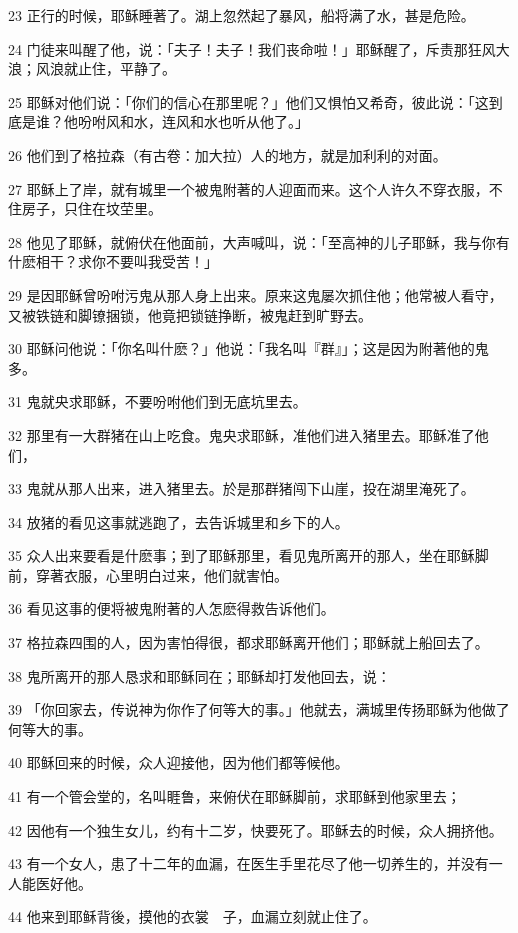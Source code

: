 \par 23 正行的时候，耶稣睡著了。湖上忽然起了暴风，船将满了水，甚是危险。
\par 24 门徒来叫醒了他，说：「夫子！夫子！我们丧命啦！」耶稣醒了，斥责那狂风大浪；风浪就止住，平静了。
\par 25 耶稣对他们说：「你们的信心在那里呢？」他们又惧怕又希奇，彼此说：「这到底是谁？他吩咐风和水，连风和水也听从他了。」
\par 26 他们到了格拉森（有古卷：加大拉）人的地方，就是加利利的对面。
\par 27 耶稣上了岸，就有城里一个被鬼附著的人迎面而来。这个人许久不穿衣服，不住房子，只住在坟茔里。
\par 28 他见了耶稣，就俯伏在他面前，大声喊叫，说：「至高神的儿子耶稣，我与你有什麽相干？求你不要叫我受苦！」
\par 29 是因耶稣曾吩咐污鬼从那人身上出来。原来这鬼屡次抓住他；他常被人看守，又被铁链和脚镣捆锁，他竟把锁链挣断，被鬼赶到旷野去。
\par 30 耶稣问他说：「你名叫什麽？」他说：「我名叫『群』」；这是因为附著他的鬼多。
\par 31 鬼就央求耶稣，不要吩咐他们到无底坑里去。
\par 32 那里有一大群猪在山上吃食。鬼央求耶稣，准他们进入猪里去。耶稣准了他们，
\par 33 鬼就从那人出来，进入猪里去。於是那群猪闯下山崖，投在湖里淹死了。
\par 34 放猪的看见这事就逃跑了，去告诉城里和乡下的人。
\par 35 众人出来要看是什麽事；到了耶稣那里，看见鬼所离开的那人，坐在耶稣脚前，穿著衣服，心里明白过来，他们就害怕。
\par 36 看见这事的便将被鬼附著的人怎麽得救告诉他们。
\par 37 格拉森四围的人，因为害怕得很，都求耶稣离开他们；耶稣就上船回去了。
\par 38 鬼所离开的那人恳求和耶稣同在；耶稣却打发他回去，说：
\par 39 「你回家去，传说神为你作了何等大的事。」他就去，满城里传扬耶稣为他做了何等大的事。
\par 40 耶稣回来的时候，众人迎接他，因为他们都等候他。
\par 41 有一个管会堂的，名叫睚鲁，来俯伏在耶稣脚前，求耶稣到他家里去；
\par 42 因他有一个独生女儿，约有十二岁，快要死了。耶稣去的时候，众人拥挤他。
\par 43 有一个女人，患了十二年的血漏，在医生手里花尽了他一切养生的，并没有一人能医好他。
\par 44 他来到耶稣背後，摸他的衣裳　子，血漏立刻就止住了。
